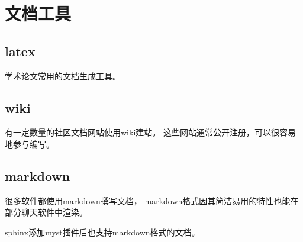 \newpage

\section{文档工具}
\subsection{latex}
学术论文常用的文档生成工具。

\subsection{wiki}
有一定数量的社区文档网站使用wiki建站。
这些网站通常公开注册，可以很容易地参与编写。
\subsection{markdown}
很多软件都使用markdown撰写文档，
markdown格式因其简洁易用的特性也能在部分聊天软件中渲染。

sphinx添加myst插件后也支持markdown格式的文档。